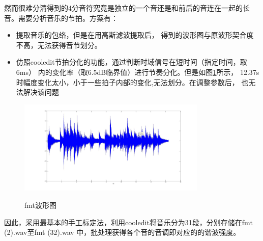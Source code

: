 \documentclass{ctexart}
\begin{document}
        然而很难分清得到的4分音符究竟是独立的一个音还是和前后的音连在一起的长音。需要分析音乐的节拍。方案有：
        \begin{itemize}
            \item{提取音乐的包络，但是在用高斯滤波提取后，
                得到的波形图与原波形契合度不高，无法获得音节划分。}
            \item{仿照cooledit节拍分化的功能，通过判断时域信号在短时间（指定时间，取6ms）
                    内的变化率（取6.5dB临界值）进行节奏分化。但是如图\ref{192}所示，
                    12.37s时幅度变化太小，小于一些拍子内部的变化,无法划分。在调整参数后，
                也无法解决该问题}
        \end{itemize}
        \begin{figure}
            \centering
            \includegraphics[width=0.8\textwidth]{fmt/1_9_2.jpg}\\
            \caption{fmt波形图\label{192}}
        \end{figure}


        因此，采用最基本的手工标定法，利用cooledit将音乐分为31段，分别存储在fmt (2).wav至fmt (32).wav 中，批处理获得各个音的音调即对应的的谐波强度。
				
\end{document}
